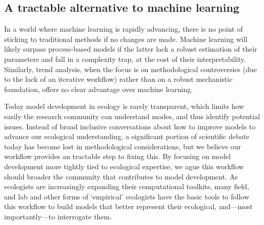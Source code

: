 \documentclass[11pt]{article}
\begin{document}
\subsection{A tractable alternative to machine learning}

In a world where machine learning is rapidly advancing, there is no point of sticking to traditional methods if no changes are made. Machine learning will likely surpass process-based models if the latter lack a robust estimation of their parameters and fall in a complexity trap, at the cost of their interpretability. Similarly, trend analysis, when the focus is on methodological controversies (due to the lack of an iterative workflow) rather than on a robust mechanistic foundation, offers no clear advantage over machine learning. %

Today model development in ecology is rarely transparent, which limits how easily the research community can understand modes, and thus identify potential issues. Instead of broad inclusive conversations about how to improve models to advance our ecological understanding, a significant portion of scientific debate today has become lost in methodological considerations, but we believe our workflow provides an tractable step to fixing this. By focusing on model development more tightly tied to ecological expertise, we ague this workflow should broader the community that contributes to model development. As ecologists are increasingly expanding their computational toolkits, many field, and lab and other forms of `empirical' ecologists have the basic tools to follow this workflow to build models that better represent their ecological, and---most importantly---to interrogate them.

\clearpage

\end{document}
